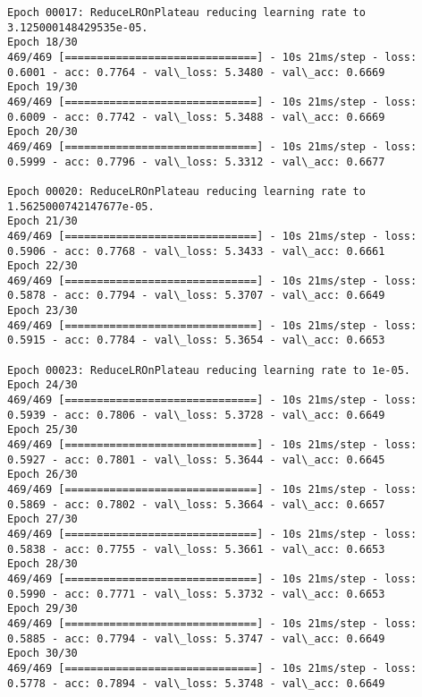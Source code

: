 \documentclass[11pt]{article}
\begin{document}
\begin{Verbatim}[commandchars=\\\{\}]
Epoch 00017: ReduceLROnPlateau reducing learning rate to 3.125000148429535e-05.
Epoch 18/30
469/469 [==============================] - 10s 21ms/step - loss: 0.6001 - acc: 0.7764 - val\_loss: 5.3480 - val\_acc: 0.6669
Epoch 19/30
469/469 [==============================] - 10s 21ms/step - loss: 0.6009 - acc: 0.7742 - val\_loss: 5.3488 - val\_acc: 0.6669
Epoch 20/30
469/469 [==============================] - 10s 21ms/step - loss: 0.5999 - acc: 0.7796 - val\_loss: 5.3312 - val\_acc: 0.6677

Epoch 00020: ReduceLROnPlateau reducing learning rate to 1.5625000742147677e-05.
Epoch 21/30
469/469 [==============================] - 10s 21ms/step - loss: 0.5906 - acc: 0.7768 - val\_loss: 5.3433 - val\_acc: 0.6661
Epoch 22/30
469/469 [==============================] - 10s 21ms/step - loss: 0.5878 - acc: 0.7794 - val\_loss: 5.3707 - val\_acc: 0.6649
Epoch 23/30
469/469 [==============================] - 10s 21ms/step - loss: 0.5915 - acc: 0.7784 - val\_loss: 5.3654 - val\_acc: 0.6653

Epoch 00023: ReduceLROnPlateau reducing learning rate to 1e-05.
Epoch 24/30
469/469 [==============================] - 10s 21ms/step - loss: 0.5939 - acc: 0.7806 - val\_loss: 5.3728 - val\_acc: 0.6649
Epoch 25/30
469/469 [==============================] - 10s 21ms/step - loss: 0.5927 - acc: 0.7801 - val\_loss: 5.3644 - val\_acc: 0.6645
Epoch 26/30
469/469 [==============================] - 10s 21ms/step - loss: 0.5869 - acc: 0.7802 - val\_loss: 5.3664 - val\_acc: 0.6657
Epoch 27/30
469/469 [==============================] - 10s 21ms/step - loss: 0.5838 - acc: 0.7755 - val\_loss: 5.3661 - val\_acc: 0.6653
Epoch 28/30
469/469 [==============================] - 10s 21ms/step - loss: 0.5990 - acc: 0.7771 - val\_loss: 5.3732 - val\_acc: 0.6653
Epoch 29/30
469/469 [==============================] - 10s 21ms/step - loss: 0.5885 - acc: 0.7794 - val\_loss: 5.3747 - val\_acc: 0.6649
Epoch 30/30
469/469 [==============================] - 10s 21ms/step - loss: 0.5778 - acc: 0.7894 - val\_loss: 5.3748 - val\_acc: 0.6649

    \end{Verbatim}
\end{document}
